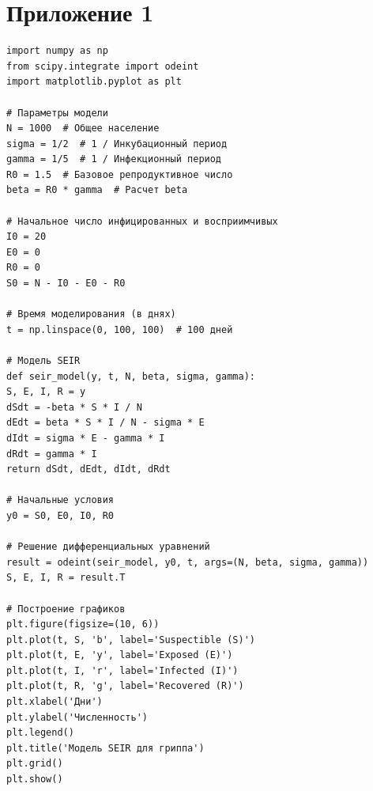 \documentclass[a4paper, 14pt]{extreport}
\begin{document}
	\section*{Приложение 1}
	\begin{verbatim}
import numpy as np
from scipy.integrate import odeint
import matplotlib.pyplot as plt

# Параметры модели
N = 1000  # Общее население
sigma = 1/2  # 1 / Инкубационный период
gamma = 1/5  # 1 / Инфекционный период
R0 = 1.5  # Базовое репродуктивное число
beta = R0 * gamma  # Расчет beta

# Начальное число инфицированных и восприимчивых
I0 = 20
E0 = 0
R0 = 0
S0 = N - I0 - E0 - R0

# Время моделирования (в днях)
t = np.linspace(0, 100, 100)  # 100 дней

# Модель SEIR
def seir_model(y, t, N, beta, sigma, gamma):
S, E, I, R = y
dSdt = -beta * S * I / N
dEdt = beta * S * I / N - sigma * E
dIdt = sigma * E - gamma * I
dRdt = gamma * I
return dSdt, dEdt, dIdt, dRdt

# Начальные условия
y0 = S0, E0, I0, R0

# Решение дифференциальных уравнений
result = odeint(seir_model, y0, t, args=(N, beta, sigma, gamma))
S, E, I, R = result.T

# Построение графиков
plt.figure(figsize=(10, 6))
plt.plot(t, S, 'b', label='Suspectible (S)')
plt.plot(t, E, 'y', label='Exposed (E)')
plt.plot(t, I, 'r', label='Infected (I)')
plt.plot(t, R, 'g', label='Recovered (R)')
plt.xlabel('Дни')
plt.ylabel('Численность')
plt.legend()
plt.title('Модель SEIR для гриппа')
plt.grid()
plt.show()
	\end{verbatim}
\end{document}
